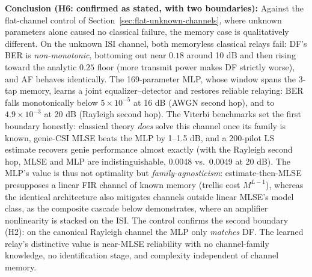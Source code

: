 \textbf{Conclusion (H6: confirmed as stated, with two boundaries):} Against the flat-channel control of Section~\ref{sec:flat-unknown-channels}, where unknown parameters alone caused no classical failure, the memory case is qualitatively different. On the unknown ISI channel, both memoryless classical relays fail: DF's BER is \emph{non-monotonic}, bottoming out near $0.18$ around 10 dB and then rising toward the analytic $0.25$ floor (more transmit power makes DF strictly worse), and AF behaves identically. The 169-parameter MLP, whose window spans the 3-tap memory, learns a joint equalizer--detector and restores reliable relaying: BER falls monotonically below $5\times10^{-5}$ at 16 dB (AWGN second hop), and to $4.9\times10^{-3}$ at 20 dB (Rayleigh second hop). The Viterbi benchmarks set the first boundary honestly: classical theory \emph{does} solve this channel once its family is known, genie-CSI MLSE beats the MLP by 1--1.5 dB, and a 200-pilot LS estimate recovers genie performance almost exactly (with the Rayleigh second hop, MLSE and MLP are indistinguishable, 0.0048 vs.\ 0.0049 at 20 dB). The MLP's value is thus not optimality but \emph{family-agnosticism}: estimate-then-MLSE presupposes a linear FIR channel of known memory (trellis cost $M^{L-1}$), whereas the identical architecture also mitigates channels outside linear MLSE's model class, as the composite cascade below demonstrates, where an amplifier nonlinearity is stacked on the ISI. The control confirms the second boundary (H2): on the canonical Rayleigh channel the MLP only \emph{matches} DF. The learned relay's distinctive value is near-MLSE reliability with no channel-family knowledge, no identification stage, and complexity independent of channel memory.

